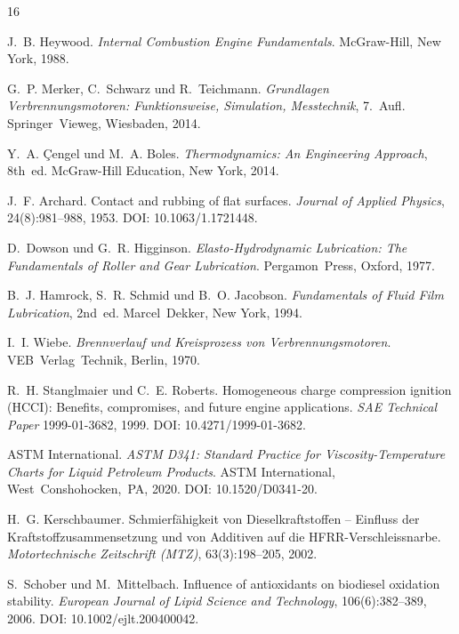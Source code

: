 ﻿\documentclass[12pt,a4paper]{article}
\begin{document}
\begin{thebibliography}{16}

  J.~B. Heywood.
  \textit{Internal Combustion Engine Fundamentals}.
  McGraw-Hill, New York, 1988.

  G.~P. Merker, C.~Schwarz und R.~Teichmann.
  \textit{Grundlagen Verbrennungsmotoren: Funktionsweise, Simulation, Messtechnik}, 7.~Aufl.
  Springer~Vieweg, Wiesbaden, 2014.

  Y.~A. \c{C}engel und M.~A. Boles.
  \textit{Thermodynamics: An Engineering Approach}, 8th~ed.
  McGraw-Hill Education, New York, 2014.

  J.~F. Archard.
  Contact and rubbing of flat surfaces.
  \textit{Journal of Applied Physics}, 24(8):981--988, 1953.
  DOI: 10.1063/1.1721448.

  D.~Dowson und G.~R. Higginson.
  \textit{Elasto-Hydrodynamic Lubrication: The Fundamentals of Roller and Gear Lubrication}.
  Pergamon~Press, Oxford, 1977.

  B.~J. Hamrock, S.~R. Schmid und B.~O. Jacobson.
  \textit{Fundamentals of Fluid Film Lubrication}, 2nd~ed.
  Marcel~Dekker, New York, 1994.

  I.~I. Wiebe.
  \textit{Brennverlauf und Kreisprozess von Verbrennungsmotoren}.
  VEB~Verlag~Technik, Berlin, 1970.

  R.~H. Stanglmaier und C.~E. Roberts.
  Homogeneous charge compression ignition (HCCI): Benefits, compromises, and future engine applications.
  \textit{SAE Technical Paper} 1999-01-3682, 1999.
  DOI: 10.4271/1999-01-3682.

  ASTM International.
  \textit{ASTM D341: Standard Practice for Viscosity-Temperature Charts for Liquid Petroleum
  Products}.
  ASTM International, West~Conshohocken,~PA, 2020.
  DOI: 10.1520/D0341-20.

  H.~G. Kerschbaumer.
  Schmierfähigkeit von Dieselkraftstoffen -- Einfluss der Kraftstoffzusammensetzung
  und von Additiven auf die HFRR-Verschleissnarbe.
  \textit{Motortechnische Zeitschrift (MTZ)}, 63(3):198--205, 2002.

  S.~Schober und M.~Mittelbach.
  Influence of antioxidants on biodiesel oxidation stability.
  \textit{European Journal of Lipid Science and Technology}, 106(6):382--389, 2006.
  DOI: 10.1002/ejlt.200400042.


\end{thebibliography}
\end{document}
